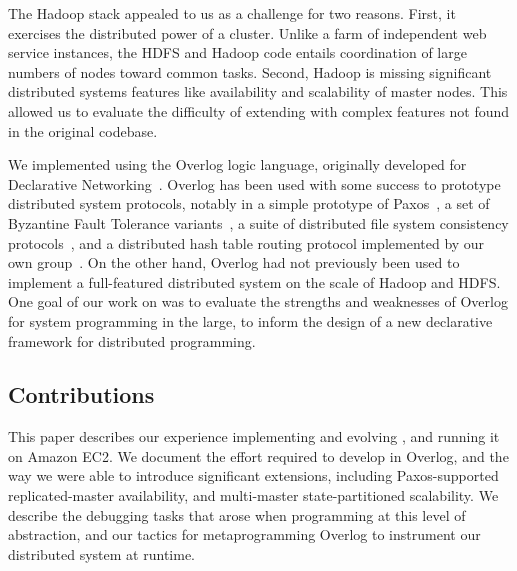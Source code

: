 The Hadoop stack appealed to us as a challenge for two reasons.  First, it
exercises the distributed power of a cluster.  Unlike a farm of independent web
service instances, the HDFS and Hadoop code entails coordination of large
numbers of nodes toward common tasks.  Second, Hadoop is missing significant
distributed systems features like availability and scalability of master
nodes. This allowed us to evaluate the difficulty of extending \BOOMA with
complex features not found in the original codebase.


We implemented \BOOMA using the Overlog logic language, originally developed for
Declarative Networking~\cite{p2}.  Overlog has been used with some success to
prototype distributed system protocols, notably in a simple prototype of
Paxos~\cite{paxonp2}, a set of Byzantine Fault Tolerance variants~\cite{singh-nsdi}, a suite of distributed file system consistency
protocols~\cite{pads}, and a distributed hash table routing protocol implemented
by our own group~\cite{p2}.  On the other hand, Overlog had not previously been
used to implement a full-featured distributed system on the scale of Hadoop and
HDFS\@.  One goal of our work on \BOOMA was to evaluate the strengths and
weaknesses of Overlog for system programming in the large, to inform the design of a new declarative
framework for distributed programming.

\subsection{Contributions}
\label{sec:contributions}
This paper describes our experience implementing and evolving \BOOMA, and
running it on Amazon EC2.  We document the effort required to develop \BOOMA in
Overlog, and the way we were able to introduce significant extensions, including
Paxos-supported replicated-master availability, and multi-master
state-partitioned scalability.  We describe the debugging tasks that arose when
programming at this level of abstraction, and our tactics for metaprogramming
Overlog to instrument our distributed system at runtime.

